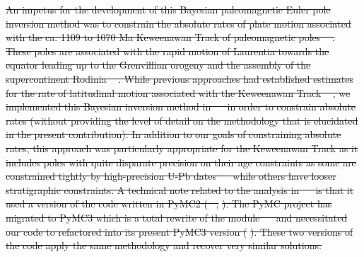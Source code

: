 \documentclass[11pt,letterpaper]{article}
\providecommand{\DIFdeltex}[1]{{\protect\color{red}\sout{#1}}}                      %
\providecommand{\DIFdel}[1]{\texorpdfstring{\DIFdeltex{#1}}{}} %
\begin{document}
\DIFdel{An impetus for the development of this Bayesian paleomagnetic Euler pole inversion method was to constrain the absolute rates of plate motion associated with the ca. 1109 to 1070 Ma Keweenawan Track of paleomagnetic poles \mbox{%
\citep{Halls1981a, Swanson-Hysell2009a, Swanson-Hysell2019a}}\hspace{0pt}%
. These poles are associated with the rapid motion of Laurentia towards the equator leading up to the Grenvillian orogeny and the assembly of the supercontinent Rodinia \mbox{%
\citep{Swanson-Hysell2021a}}\hspace{0pt}%
. While previous approaches had established estimates for the rate of latitudinal motion associated with the Keweenawan Track \mbox{%
\citep{Davis1997a, Swanson-Hysell2014b}}\hspace{0pt}%
, we implemented this Bayesian inversion method in \mbox{%
\cite{Swanson-Hysell2019a} }\hspace{0pt}%
in order to constrain absolute rates (without providing the level of detail on the methodology that is elucidated in the present contribution). In addition to our goals of constraining absolute rates, this approach was particularly appropriate for the Keweenawan Track as it includes poles with quite disparate precision on their age constraints as some are constrained tightly by high-precision U-Pb dates \mbox{%
\citep[e.g.][]{Fairchild2017a} }\hspace{0pt}%
while others have looser stratigraphic constraints. A technical note related to the analysis in \mbox{%
\cite{Swanson-Hysell2019a} }\hspace{0pt}%
is that it used a version of the code written in PyMC2 (\mbox{%
\citealp{Patil2010a}}\hspace{0pt}%
; }%
\DIFdel{). The PyMC project has migrated to PyMC3 which is a total rewrite of the module \mbox{%
\citep{Salvatier2016a} }\hspace{0pt}%
and necessitated our code to refactored into its present PyMC3 version (}%
\DIFdel{). These two versions of the code apply the same methodology and recover very similar solutions.
}%
\end{document}
